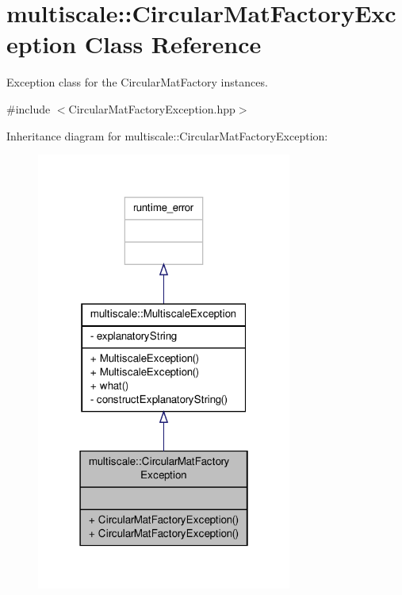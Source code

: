 \hypertarget{classmultiscale_1_1CircularMatFactoryException}{\section{multiscale\-:\-:Circular\-Mat\-Factory\-Exception Class Reference}
\label{classmultiscale_1_1CircularMatFactoryException}
}


Exception class for the Circular\-Mat\-Factory instances.  




{\ttfamily \#include $<$Circular\-Mat\-Factory\-Exception.\-hpp$>$}



Inheritance diagram for multiscale\-:\-:Circular\-Mat\-Factory\-Exception\-:\nopagebreak
\begin{figure}[H]
\begin{center}
\leavevmode
\includegraphics[width=238pt]{classmultiscale_1_1CircularMatFactoryException__inherit__graph}
\end{center}
\end{figure}


